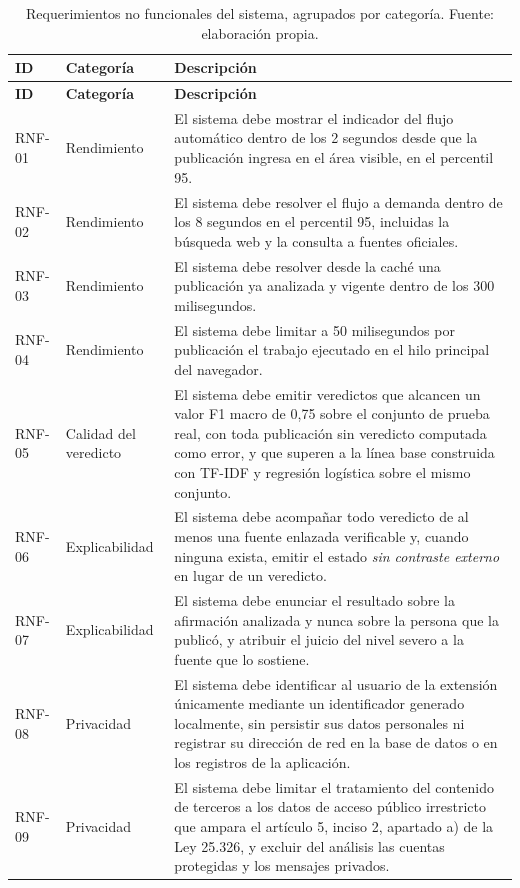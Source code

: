 \begin{small}
\begin{longtable}{@{}p{1.5cm} p{2.6cm} p{9.6cm}@{}}
  \caption{Requerimientos no funcionales del sistema, agrupados por categoría. Fuente: elaboración propia.}
  \label{tab:rnf} \\
  \hline
  \textbf{ID} & \textbf{Categoría} & \textbf{Descripción} \\
  \hline
  \endfirsthead
  \hline
  \textbf{ID} & \textbf{Categoría} & \textbf{Descripción} \\
  \hline
  \endhead
  \hline
  \endfoot
  RNF-01 & Rendimiento & El sistema debe mostrar el indicador del flujo automático dentro de los 2 segundos desde que la publicación ingresa en el área visible, en el percentil 95. \\
  RNF-02 & Rendimiento & El sistema debe resolver el flujo a demanda dentro de los 8 segundos en el percentil 95, incluidas la búsqueda web y la consulta a fuentes oficiales. \\
  RNF-03 & Rendimiento & El sistema debe resolver desde la caché una publicación ya analizada y vigente dentro de los 300 milisegundos. \\
  RNF-04 & Rendimiento & El sistema debe limitar a 50 milisegundos por publicación el trabajo ejecutado en el hilo principal del navegador. \\
  RNF-05 & Calidad del veredicto & El sistema debe emitir veredictos que alcancen un valor F1 macro de 0,75 sobre el conjunto de prueba real, con toda publicación sin veredicto computada como error, y que superen a la línea base construida con TF-IDF y regresión logística sobre el mismo conjunto. \\
  RNF-06 & Explicabilidad & El sistema debe acompañar todo veredicto de al menos una fuente enlazada verificable y, cuando ninguna exista, emitir el estado \emph{sin contraste externo} en lugar de un veredicto. \\
  RNF-07 & Explicabilidad & El sistema debe enunciar el resultado sobre la afirmación analizada y nunca sobre la persona que la publicó, y atribuir el juicio del nivel severo a la fuente que lo sostiene. \\
  RNF-08 & Privacidad & El sistema debe identificar al usuario de la extensión únicamente mediante un identificador generado localmente, sin persistir sus datos personales ni registrar su dirección de red en la base de datos o en los registros de la aplicación. \\
  RNF-09 & Privacidad & El sistema debe limitar el tratamiento del contenido de terceros a los datos de acceso público irrestricto que ampara el artículo 5, inciso 2, apartado a) de la Ley 25.326, y excluir del análisis las cuentas protegidas y los mensajes privados. \\

\end{longtable}
\end{small}
